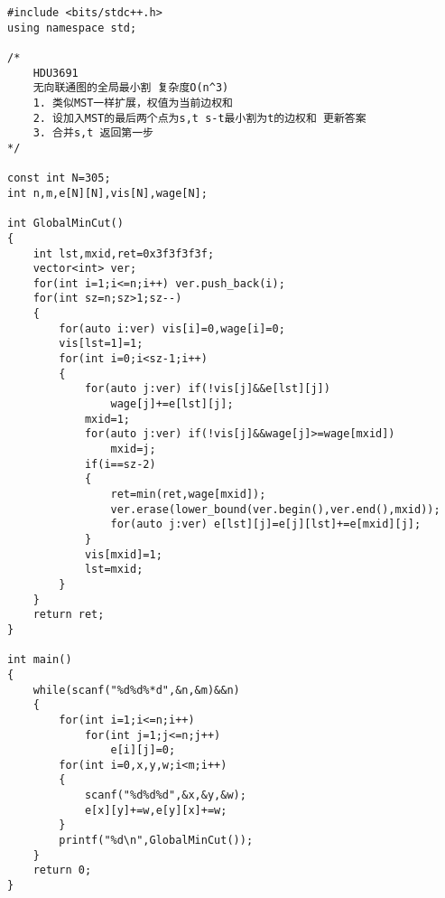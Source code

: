 \begin{lstlisting}
#include <bits/stdc++.h>
using namespace std;

/*
    HDU3691
    无向联通图的全局最小割 复杂度O(n^3)
    1. 类似MST一样扩展，权值为当前边权和
    2. 设加入MST的最后两个点为s,t s-t最小割为t的边权和 更新答案
    3. 合并s,t 返回第一步
*/

const int N=305;
int n,m,e[N][N],vis[N],wage[N];

int GlobalMinCut()
{
    int lst,mxid,ret=0x3f3f3f3f;
    vector<int> ver;
    for(int i=1;i<=n;i++) ver.push_back(i);
    for(int sz=n;sz>1;sz--)
    {
        for(auto i:ver) vis[i]=0,wage[i]=0;
        vis[lst=1]=1;
        for(int i=0;i<sz-1;i++)
        {
            for(auto j:ver) if(!vis[j]&&e[lst][j])
                wage[j]+=e[lst][j];
            mxid=1;
            for(auto j:ver) if(!vis[j]&&wage[j]>=wage[mxid])
                mxid=j;
            if(i==sz-2)
            {
                ret=min(ret,wage[mxid]);
                ver.erase(lower_bound(ver.begin(),ver.end(),mxid));
                for(auto j:ver) e[lst][j]=e[j][lst]+=e[mxid][j];
            }
            vis[mxid]=1;
            lst=mxid;
        }
    }
    return ret;
}

int main()
{
    while(scanf("%d%d%*d",&n,&m)&&n)
    {
        for(int i=1;i<=n;i++)
            for(int j=1;j<=n;j++)
                e[i][j]=0;
        for(int i=0,x,y,w;i<m;i++)
        {
            scanf("%d%d%d",&x,&y,&w);
            e[x][y]+=w,e[y][x]+=w;
        }
        printf("%d\n",GlobalMinCut());
    }
    return 0;
}
\end{lstlisting}
